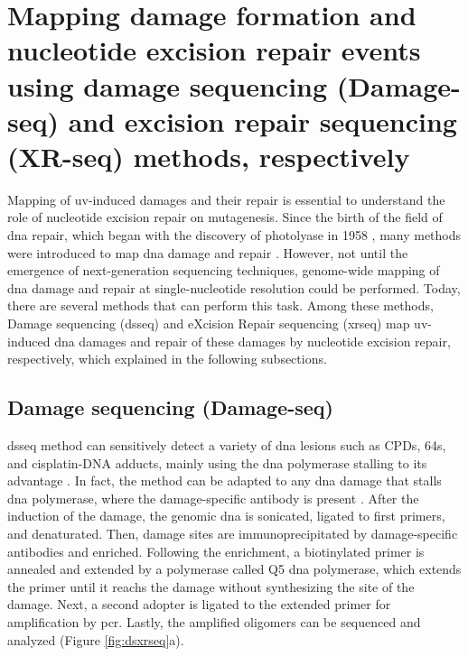 \section{Mapping damage formation and nucleotide excision repair events using damage sequencing (Damage-seq) and excision repair sequencing (XR-seq) methods, respectively}

Mapping of \gls{uv}-induced damages and their repair is essential to understand the role of nucleotide excision repair on mutagenesis. Since the birth of the field of \gls{dna} repair, which began with the discovery of photolyase in 1958 \citep{rupert1958photoreactivation,sancar2016mechanisms}, many methods were introduced to map \gls{dna} damage and repair \citep{li2020methodologies}. However, not until the emergence of next-generation sequencing techniques, genome-wide mapping of \gls{dna} damage and repair at single-nucleotide resolution could be performed. Today, there are several methods that can perform this task. Among these methods, Damage sequencing (\gls{dsseq}) and eXcision Repair sequencing (\gls{xrseq}) map \gls{uv}-induced \gls{dna} damages and repair of these damages by nucleotide excision repair, respectively, which explained in the following subsections.

\subsection{Damage sequencing (Damage-seq)}

\gls{dsseq} method can sensitively detect a variety of \gls{dna} lesions such as \gls{CPD}s, \gls{64}s, and cisplatin-DNA adducts, mainly using the \gls{dna} polymerase stalling to its advantage \citep{hu2016cisplatin}. In fact, the method can be adapted to any \gls{dna} damage that stalls \gls{dna} polymerase, where the damage-specific antibody is present \citep{sancar2016mechanisms}. After the induction of the damage, the genomic \gls{dna} is sonicated, ligated to first primers, and denaturated. Then, damage sites are immunoprecipitated by damage-specific antibodies and enriched. Following the enrichment, a biotinylated primer is annealed and extended by a polymerase called Q5 \gls{dna} polymerase, which extends the primer until it reachs the damage without synthesizing the site of the damage. Next, a second adopter is ligated to the extended primer for amplification by \gls{pcr}. Lastly, the amplified oligomers can be sequenced and analyzed (Figure \ref{fig:dsxrseq}a).      

